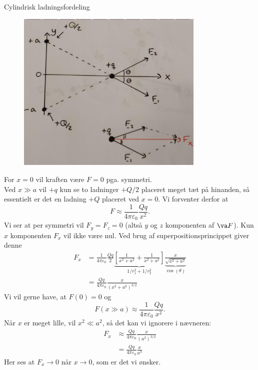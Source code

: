 \begin{opgave}{Cylindrisk ladningsfordeling}
    \opg
    \begin{figure}[H]
        \centering
        \includegraphics[width=0.8\textwidth]{facit/figurer/elektro/elektro_opg10,1.jpg}
    \end{figure}
    \opg For $x=0$ vil kraften være $F=0$ pga. symmetri.\\
    Ved $x\gg a$ vil $+q$ kun se to ladninger $+Q/2$ placeret meget tæt på hinanden, så essentielt er det en ladning $+Q$ placeret ved $x=0$. Vi forventer derfor at
    \[ F\approx\frac{1}{4\pi\varepsilon_0}\frac{Qq}{x^2}. \]
    \opg Vi ser at per symmetri vil $F_y=F_z=0$ (altså $y$ og $z$ komponenten af $\va F$). Kun $x$ komponenten $F_x$ vil ikke være nul. Ved brug af superpositionsprincippet giver denne
    \begin{align*}
        F_x&=\frac{1}{4\pi\varepsilon_0}\frac{Qq}{2}\underbrace{\left[\frac{1}{x^2+a^2}+\frac{1}{x^2+a^2}\right]}_{\text{$1/r_1^2+1/r_2^2$}}\underbrace{\frac{x}{\sqrt{x^2+a^2}}}_{\text{$\cos(\theta)$}}\\
        &=\frac{Qq}{4\pi\varepsilon_0}\frac{x}{(x^2+a^2)^{3/2}}
    \end{align*}
    \opg Vi vil gerne have, at $F(0)=0$ og
    \[ F(x\gg a)\approx\frac{1}{4\pi\varepsilon_0}\frac{Qq}{x^2}. \]
    Når $x$ er meget lille, vil $x^2\ll a^2$, så det kan vi ignorere i nævneren:
    \begin{align*}
        F_x&\approx \frac{Qq}{4\pi\varepsilon_0}\frac{x}{(a^2)^{3/2}}\\
        &=\frac{Qq}{4\pi\varepsilon_0}\frac{x}{a^3}
    \end{align*}
    Her ses at $F_x\to 0$ når $x\to 0$, som er det vi ønsker.\\

\end{opgave}
